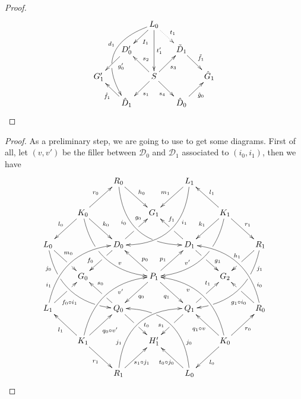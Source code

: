 \documentclass[a4paper,UKenglish,cleveref,pdftex, thm-restate,numberwithinsect,anonymous]{lipics}
\def\G{\textbf {\textup{G}}}
\newcommand{\dder}[1]{\mathscr{#1}}
\begin{document}
\begin{proof}
\[\xymatrix@R=15pt@C=15pt{&&L_ 0\ar[dl]^{I_1} \ar@/_1.2cm/[dddl]_(.4){d_1}|(.63)\hole\ar[dd]^{t'_1} \ar@{.>}[dr]^{t_1}\\&D'_0 \ar[dl]^(.4){g'_0}&&\tilde{D}_1 \ar[dr]^{\tilde{f}_1}\\G'_1 && S\ar[dr]_{s_4} \ar[ur]_{s_3}\ar[dl]^{s_1} \ar[ul]_{s_2}&&\hat{G}_1\\& \hat{D}_1 \ar[ul]^{\hat{f}_1}&&\hat{D}_0 \ar[ur]_{\hat{g}_0}}\]
\end{proof}


\lemIndepGlobalLeft*
\label{lemIndepGlobalLeft-proof}

\begin{proof}
  As a preliminary step, we are going to use
   to get some diagrams.  First of all,
  let $(v,v')$ be the filler between $\dder{D}_0$ and $\dder{D}_1$
  associated to $(i_0, i_1)$, then we have
  \[\xymatrix{&&R_0 \ar@/_1cm/[ddrr]_(.35){i_0}|(.7)\hole
  	\ar[dr]^{h_0}&& L_1\ar@/^1cm/[ddll]^(.35){i_1}
  	\ar[dl]_{m_1}\\&K_0\ar[dr]^{k_0}\ar[dl]_{l_0}
  	\ar@/_.8cm/[ddrr]|(.36)\hole^(.65){v}\ar[ur]^{r_0}&& G_1 &&
  	K_1
  	\ar@/^.8cm/[ddll]|(.36)\hole_(.65){v'}\ar[dl]_{k_1}\ar[lu]_{l_1}
  	\ar[dr]^{r_1}\\L_0
  	\ar@/_.8cm/[ddrr]_(.2){j_0}|(.31)\hole|(.81)\hole
  	\ar[dr]^(.4){m_0}|(.61)\hole && D_0
  	\ar[dl]|(.4)\hole_(.65){f_0}\ar[ur]|(.5)\hole^(.7){g_0}&&D_1
  	\ar[dr]|(.4)\hole^(.65){g_1}
  	\ar[ul]|(.5)\hole_(.65){f_1}&&R_1\ar@/^.8cm/[ddll]^(.2){j_1}|(.31)\hole|(.81)\hole\ar[dl]_{h_1}|(.6)\hole\\&G_0
  	&&P_1\ar[dr]_{q_1}
  	\ar[dl]^{q_0}\ar[ur]^(.4){p_1}\ar[ul]_(.4){p_0}&&G_2\\L_1
  	\ar@/^.8cm/[uurr]^(.2){i_1} \ar[ur]_(.35){f_0\circ
  		i_1}|(.61)\hole&&Q_0
  	\ar[ul]|(.4)\hole_(.65){s_0}\ar[dr]|(.5)\hole^(.65){t_0}
  	&&Q_1\ar[ur]|(.4)\hole^(.65){t_1} \ar[dl]|(.5)\hole_(.65){s_1}
  	&& R_0 \ar[ul]^(.35){g_1\circ
  		i_0}|(.61)\hole\ar@/_.8cm/[uull]_(.2){i_0}\\&K_1
  	\ar[ur]_{q_0\circ v'} \ar[dr]_{r_1}
  	\ar[ul]^{l_1}\ar@/^.8cm/[uurr]_(.65){v'}&&H'_1&& K_0
  	\ar[ur]_{r_0} \ar[ul]^{q_1\circ v} \ar[dl]^{l_0}
  	\ar@/_.8cm/[uull]^(.65){v}\\&& R_1
  	\ar[ur]_{\hspace{-5pt}s_1\circ
  		j_1}\ar@/^1cm/[uurr]^(.25){j_1}&& L_0 \ar[ul]^{t_0\circ
  		j_0\hspace{-5pt}} \ar@/_1cm/[uull]_(.25){j_0} |(.69)\hole
  }\]


\end{proof}
\end{document}
